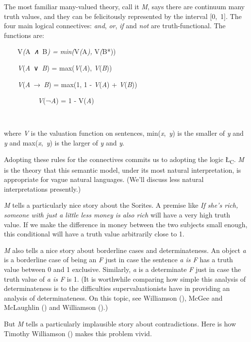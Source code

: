\documentclass[
  10pt,
  letterpaper,
  DIV=11,
  numbers=noendperiod,
  twoside]{scrartcl}
\begin{document}
The most familiar many-valued theory, call it \emph{M}, says there are
continuum many truth values, and they can be felicitously represented by
the interval {[}0,~1{]}. The four main logical connectives: \emph{and},
\emph{or}, \emph{if} and \emph{not} are truth-functional. The functions
are:

\hfill\break
~~~~\noindent *V\emph{(}A\emph{~∧~}B\emph{) = min(}V\emph{(}A\emph{),
}V\emph{(}B*))\\
\strut ~~~~\emph{V}(\emph{A}~∨~\emph{B}) = max(\emph{V}(\emph{A}),
\emph{V}(\emph{B}))\\
\strut ~~~~\emph{V}(\emph{A}~→~\emph{B}) = max(1, 1 - \emph{V}(\emph{A})
+ \emph{V}(\emph{B}))\\
\strut ~~~~~~~~~~\emph{V}(¬\emph{A}) = 1 - V(\emph{A})\\
\strut ~~~

\noindent where \emph{V} is the valuation function on sentences,
min(\emph{x},~\emph{y}) is the smaller of \emph{y} and \emph{y} and
max(\emph{x},~\emph{y}) is the larger of \emph{y} and \emph{y}.

Adopting these rules for the connectives commits us to adopting the
logic Ł\textsubscript{C}. \emph{M} is the theory that this semantic
model, under its most natural interpretation, is appropriate for vague
natural languages. (We'll discuss less natural interpretations
presently.)

\emph{M} tells a particularly nice story about the Sorites. A premise
like \emph{If she's rich, someone with just a little less money is also
rich} will have a very high truth value. If we make the difference in
money between the two subjects small enough, this conditional will have
a truth value arbitrarily close to 1.

\emph{M} also tells a nice story about borderline cases and
determinateness. An object \emph{a} is a borderline case of being an
\emph{F} just in case the sentence \emph{a is F} has a truth value
between 0 and 1 exclusive. Similarly, \emph{a} is a determinate \emph{F}
just in case the truth value of \emph{a is F} is 1. (It is worthwhile
comparing how simple this analysis of determinateness is to the
difficulties supervaluationists have in providing an analysis of
determinateness. On this topic, see Williamson
(), McGee and McLaughlin
() and Williamson
().)

But \emph{M} tells a particularly implausible story about
contradictions. Here is how Timothy Williamson
() makes this problem vivid.
\end{document}
